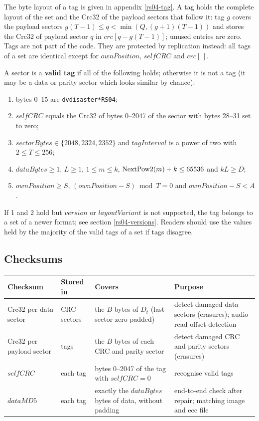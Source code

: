 The byte layout of a tag is given in appendix \ref{rs04-tag}. A tag holds
the complete layout of the set and the Crc32 of the payload sectors that
follow it: tag $g$ covers the payload sectors
$g(T-1) \le q < \min(Q, (g+1)(T-1))$ and stores the Crc32 of payload sector
$q$ in $crc[q - g(T-1)]$; unused entries are zero. Tags are not part of
the code. They are protected by replication instead: all tags of a set are
identical except for $ownPosition$, $selfCRC$ and $crc[\,]$.

\medskip

A sector is a {\bf valid tag} if all of the following holds; otherwise it
is not a tag (it may be a data or parity sector which looks similar by
chance):

\begin{enumerate}
\item bytes 0--15 are {\tt *dvdisaster*RS04};
\item $selfCRC$ equals the Crc32 of bytes 0--2047 of the sector with bytes
  28--31 set to zero;
\item $sectorBytes \in \{2048, 2324, 2352\}$ and $tagInterval$ is a power
  of two with $2 \le T \le 256$;
\item $dataBytes \ge 1$, $L \ge 1$, $1 \le m \le k$,
  ${\rm NextPow2}(m) + k \le 65536$ and $kL \ge D$;
\item $ownPosition \ge S$, $(ownPosition - S) \bmod T = 0$ and
  $ownPosition - S < A$.
\end{enumerate}

If 1 and 2 hold but $version$ or $layoutVariant$ is not supported, the tag
belongs to a set of a newer format; see section \ref{rs04-versions}.
Readers should use the values held by the majority of the valid tags of a
set if tags disagree.

\subsection{Checksums}
\label{rs04-checksums}

\begin{tabular}{|p{2.8cm}|p{2.2cm}|p{4.5cm}|p{4.5cm}|}
\hline
Checksum & Stored in & Covers & Purpose \\
\hline
Crc32 per data sector & CRC sectors & the $B$ bytes of $D_t$ (last sector
zero-padded) & detect damaged data sectors (erasures); audio read offset
detection \\
\hline
Crc32 per payload sector & tags & the $B$ bytes of each CRC and parity
sector & detect damaged CRC and parity sectors (erasures) \\
\hline
$selfCRC$ & each tag & bytes 0--2047 of the tag with $selfCRC = 0$ &
recognise valid tags \\
\hline
$dataMD5$ & each tag & exactly the $dataBytes$ bytes of data, without
padding & end-to-end check after repair; matching image and ecc file \\
\hline
\end{tabular}
\medskip

